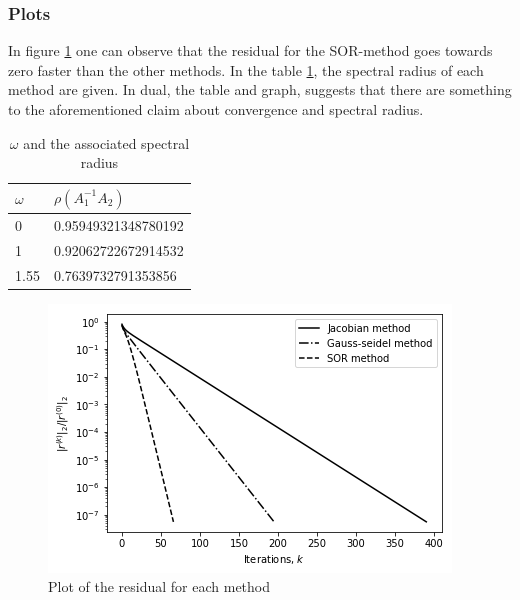 \documentclass[12pt, a4paper,usenames,dvipsnames]{article}
\begin{document}
\subsubsection*{Plots}
In figure \ref{fig:res} one can observe that the residual for the SOR-method goes towards zero faster than the other methods. In the table \ref{tab:Specrad}, the spectral radius of each method are given. In dual, the table and graph, suggests that there are something to the aforementioned claim about convergence and spectral radius.
\begin{table}[h!]
    \centering
    \begin{tabular}{ll}
        \(\omega\) & \(\rho(A_1^{-1}A_2)\)  \\ \hline
        0 &0.95949321348780192\\
        1&0.92062722672914532\\
        1.55&0.7639732791353856
        
    \end{tabular}
    \caption{\(\omega\) and the associated spectral radius}
    \label{tab:Specrad}
\end{table}
\begin{figure}[h!]
    \centering
    \includegraphics[width=\linewidth]{2a.png}
    \caption{Plot of the residual for each method}
    \label{fig:res}
\end{figure}
\end{document}
